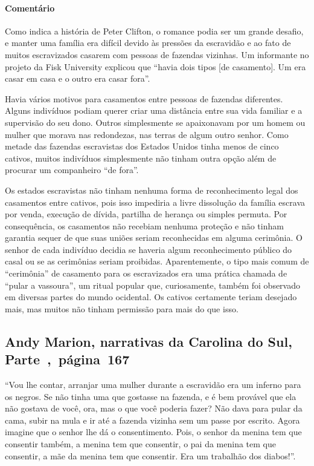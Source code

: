 \paragraph{Comentário}\quad
{\small
Como indica a história de Peter Clifton, o romance podia ser um
grande desafio, e manter uma família era difícil devido às pressões da
escravidão e ao fato de muitos escravizados casarem com pessoas de fazendas
vizinhas. Um informante no projeto da Fisk University explicou que
``havia dois tipos {[}de casamento{]}. Um era casar em casa e o outro
era casar fora''. 

Havia vários motivos para casamentos entre
pessoas de fazendas diferentes. Alguns indivíduos podiam querer
criar uma distância entre sua vida familiar e a supervisão do seu dono.
Outros simplesmente se apaixonavam por um homem ou mulher que morava nas
redondezas, nas terras de algum outro senhor. Como metade das fazendas
escravistas dos Estados Unidos tinha menos de cinco cativos, muitos
indivíduos simplesmente não tinham outra opção além de procurar um
companheiro ``de fora''.

Os estados escravistas não tinham nenhuma forma de reconhecimento
legal dos casamentos entre cativos, pois isso impediria a livre
dissolução da família escrava por venda, execução de dívida, partilha de
herança ou simples permuta. Por consequência, os casamentos
não recebiam nenhuma proteção e não tinham garantia sequer de que suas
uniões seriam reconhecidas em alguma cerimônia. O senhor de cada
indivíduo decidia se haveria algum reconhecimento público do casal ou se
as cerimônias seriam proibidas. Aparentemente, o tipo mais comum de
``cerimônia'' de casamento para os escravizados era uma prática chamada de
``pular a vassoura'', um ritual popular que, curiosamente, também foi
observado em diversas partes do mundo ocidental. Os cativos certamente
teriam desejado mais, mas muitos não tinham permissão para mais do que
isso.
}

\subsection{Andy Marion, narrativas da Carolina do Sul, Parte~,~página~167}
\label{ref182}

``Vou lhe contar, arranjar uma mulher durante a escravidão era um
inferno para os negros. Se não tinha uma que gostasse na fazenda, e é
bem provável que ela não gostava de você, ora, mas o que você poderia
fazer? Não dava para pular da cama, subir na mula e ir até a fazenda
vizinha sem um passe por escrito. Agora imagine que o senhor lhe dá o
consentimento. Pois, o senhor da menina tem que consentir também, a
menina tem que consentir, o pai da menina tem que consentir, a mãe da
menina tem que consentir. Era um trabalhão dos diabos!''.

